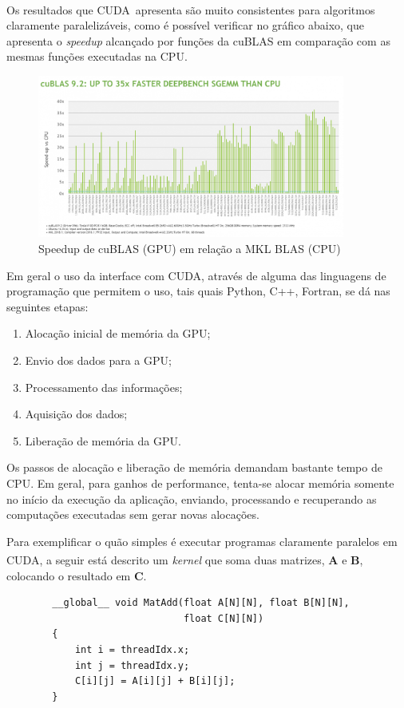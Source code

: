 \documentclass[cic,tc]{iiufrgs}
\newcommand{\mat}[1]{\bm{#1}}
\newcommand{\reg}{\textsuperscript{\textregistered}}
\begin{document}
Os resultados que CUDA\reg~apresenta são muito consistentes para algoritmos claramente
paralelizáveis, como é possível verificar no gráfico abaixo, que apresenta o 
\emph{speedup} alcançado por funções da cuBLAS em comparação com as mesmas funções 
executadas na CPU.
\begin{figure}[H]
    \caption{Speedup de cuBLAS (GPU) em relação a MKL BLAS (CPU)}
    \begin{center}
        \includegraphics[width=0.9\textwidth]{img/cublas9_2.png}
    \end{center}
\end{figure}


Em geral o uso da interface com CUDA, através de alguma das linguagens de programação 
que permitem o uso, tais quais Python, C++, Fortran, se dá nas seguintes etapas:
\begin{enumerate}
    \item Alocação inicial de memória da GPU;
    \item Envio dos dados para a GPU;
    \item Processamento das informações;
    \item Aquisição dos dados;
    \item Liberação de memória da GPU.
\end{enumerate}

Os passos de alocação e liberação de memória demandam bastante tempo de CPU.
Em geral, para ganhos de performance, tenta-se alocar memória somente no início da
execução da aplicação, enviando, processando e recuperando as computações executadas 
sem gerar novas alocações.

Para exemplificar o quão simples é executar programas claramente paralelos em 
CUDA\reg, a seguir está descrito um \textit{kernel} que soma duas matrizes,
$\mat{A}$ e $\mat{B}$, colocando o resultado em $\mat{C}$.
\begin{center}
    \begin{lstlisting}
        __global__ void MatAdd(float A[N][N], float B[N][N],
                               float C[N][N])
        {
            int i = threadIdx.x;
            int j = threadIdx.y;
            C[i][j] = A[i][j] + B[i][j];
        }
        \end{lstlisting}
\end{center}
\end{document}
